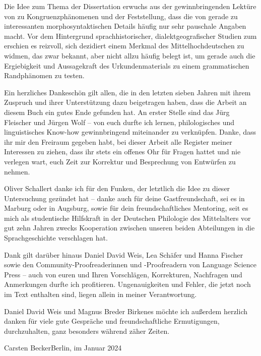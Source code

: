 Die Idee zum Thema der Dissertation erwuchs aus der gewinnbringenden Lektüre
von \citet{corbett2006} zu Kongruenz\-phänomenen und der Feststellung, dass die
 von \citet{paul2007} gerade zu interessanten
morpho\-syntaktischen Details häufig nur sehr pauschale Angaben macht. Vor dem
Hintergrund sprach\-historischer, dialekt\-geografischer Studien zum \CAO{}
\autocite{beckerschallert2021,beckerschallert2022a, beckerschallert2022b}
erschien es reizvoll, sich dezidiert einem Merkmal des Mittelhochdeutschen zu
widmen, das zwar bekannt, aber nicht allzu häufig belegt ist, um gerade auch
die Ergiebigkeit und Aussagekraft des Urkunden\-materials zu einem
grammatischen Randphänomen zu testen.

Ein herzliches Dankeschön gilt allen, die in den letzten sieben Jahren mit
ihrem Zuspruch und ihrer Unterstützung dazu beigetragen haben, dass die Arbeit
an diesem Buch ein gutes Ende gefunden hat. An erster Stelle sind das Jürg
Fleischer und Jürgen Wolf -- von euch durfte ich lernen, philologisches und
linguistisches Know-how gewinnbringend miteinander zu verknüpfen. Danke, dass
ihr mir den Freiraum gegeben habt, bei dieser Arbeit alle Register meiner
Interessen zu ziehen, dass ihr stets ein offenes Ohr für Fragen hattet und nie
verlegen wart, euch Zeit zur Korrektur und Besprechung von Entwürfen zu nehmen.

Oliver Schallert danke ich für den Funken, der letztlich die Idee zu dieser
Untersuchung gezündet hat -- danke auch für deine Gastfreundschaft, sei es in
Marburg oder in Augsburg, sowie für dein freundschaftliches Mentoring, seit es
mich als studentische Hilfskraft in der Deutschen Philologie des Mittelalters
vor gut zehn Jahren zwecks Kooperation zwischen unseren beiden Abteilungen in
die Sprachgeschichte verschlagen hat.

Dank gilt darüber hinaus Daniel David Weis, Lea Schäfer und Hanna Fischer sowie
den Community-Proofreaderinnen und -Proofreadern von Language Science Press --
auch von euren und Ihren Vorschlägen, Korrekturen, Nachfragen und Anmerkungen
durfte ich profitieren. Ungenauigkeiten und Fehler, die jetzt noch im Text
enthalten sind, liegen allein in meiner Verantwortung.

\begin{sloppypar}
Daniel David Weis und Magnus Breder Birkenes möchte ich außerdem herzlich
danken für viele gute Gespräche und freundschaftliche Ermutigungen,
durchzuhalten, ganz besonders während zäher Zeiten.
\end{sloppypar}
\bigskip

\noindent%
Carsten Becker\hfill Berlin, im Januar 2024

